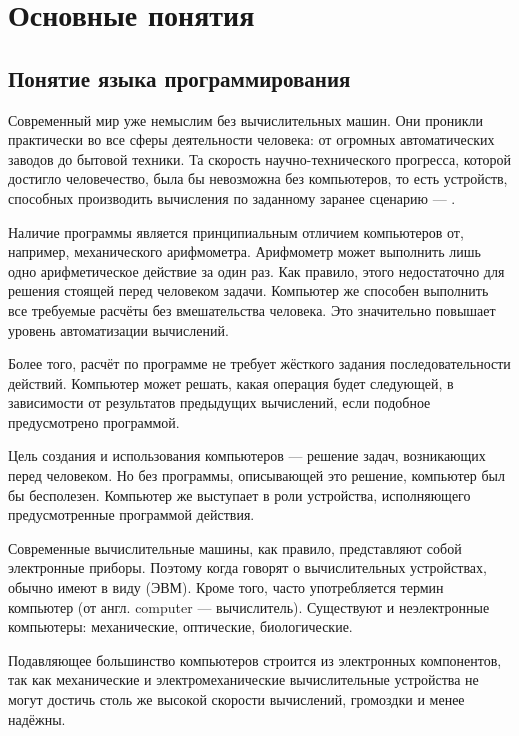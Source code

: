 \chapter{Основные понятия}

\section{Понятие языка программирования}

Современный мир уже немыслим без вычислительных машин. Они проникли
практически во все сферы деятельности человека: от огромных
автоматических заводов до бытовой техники. Та скорость
научно-технического прогресса, которой достигло человечество, была бы
невозможна без компьютеров, то есть устройств, способных производить
вычисления по заданному заранее сценарию —
.

Наличие программы является принципиальным отличием компьютеров от,
например, механического арифмометра. Арифмометр может выполнить лишь
одно арифметическое действие за один раз. Как правило, этого
недостаточно для решения стоящей перед человеком задачи. Компьютер же
способен выполнить все требуемые расчёты без вмешательства
человека. Это значительно повышает уровень автоматизации вычислений.

Более того, расчёт по программе не требует жёсткого задания
последовательности действий. Компьютер может решать, какая операция
будет следующей, в зависимости от результатов предыдущих вычислений,
если подобное предусмотрено программой.

Цель создания и использования компьютеров — решение задач, возникающих
перед человеком. Но без программы, описывающей это решение, компьютер
был бы бесполезен. Компьютер же выступает в роли устройства,
исполняющего предусмотренные программой действия.

Современные вычислительные машины, как правило, представляют собой
электронные приборы. Поэтому когда говорят о вычислительных
устройствах, обычно имеют в виду  (ЭВМ).  Кроме
того, часто употребляется термин компьютер (от англ. computer —
вычислитель). Существуют и неэлектронные компьютеры: механические,
оптические, биологические.

Подавляющее большинство компьютеров строится из электронных
компонентов, так как механические и электромеханические вычислительные
устройства не могут достичь столь же высокой скорости вычислений,
громоздки и менее надёжны.

